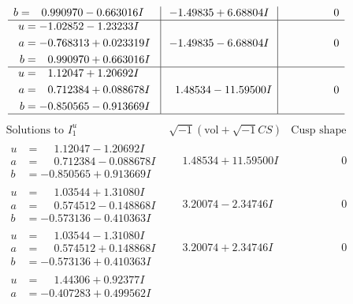 \documentclass[1p]{elsarticle_modified}
\theoremstyle{definition}
\newcommand{\I}{\sqrt{-1}}
\begin{document}
$$\begin{array}{c|c|c}
\begin{aligned}
b &= \phantom{-}0.990970 - 0.663016 I\end{aligned}
 & -1.49835 + 6.68804 I & \phantom{-0.000000 } 0 \\ \hline\begin{aligned}
u &= -1.02852 - 1.23233 I \\
a &= -0.768313 + 0.023319 I \\
b &= \phantom{-}0.990970 + 0.663016 I\end{aligned}
 & -1.49835 - 6.68804 I & \phantom{-0.000000 } 0 \\ \hline\begin{aligned}
u &= \phantom{-}1.12047 + 1.20692 I \\
a &= \phantom{-}0.712384 + 0.088678 I \\
b &= -0.850565 - 0.913669 I\end{aligned}
 & \phantom{-}1.48534 - 11.59500 I & \phantom{-0.000000 } 0\\
 \hline 
 \end{array}$$\newpage$$\begin{array}{c|c|c}  
\text{Solutions to }I^u_{1}& \I (\text{vol} + \sqrt{-1}CS) & \text{Cusp shape}\\
 \hline 
\begin{aligned}
u &= \phantom{-}1.12047 - 1.20692 I \\
a &= \phantom{-}0.712384 - 0.088678 I \\
b &= -0.850565 + 0.913669 I\end{aligned}
 & \phantom{-}1.48534 + 11.59500 I & \phantom{-0.000000 } 0 \\ \hline\begin{aligned}
u &= \phantom{-}1.03544 + 1.31080 I \\
a &= \phantom{-}0.574512 - 0.148868 I \\
b &= -0.573136 - 0.410363 I\end{aligned}
 & \phantom{-}3.20074 - 2.34746 I & \phantom{-0.000000 } 0 \\ \hline\begin{aligned}
u &= \phantom{-}1.03544 - 1.31080 I \\
a &= \phantom{-}0.574512 + 0.148868 I \\
b &= -0.573136 + 0.410363 I\end{aligned}
 & \phantom{-}3.20074 + 2.34746 I & \phantom{-0.000000 } 0 \\ \hline\begin{aligned}
u &= \phantom{-}1.44306 + 0.92377 I \\
a &= -0.407283 + 0.499562 I \\

\end{aligned}
\end{array}$$
\end{document}
